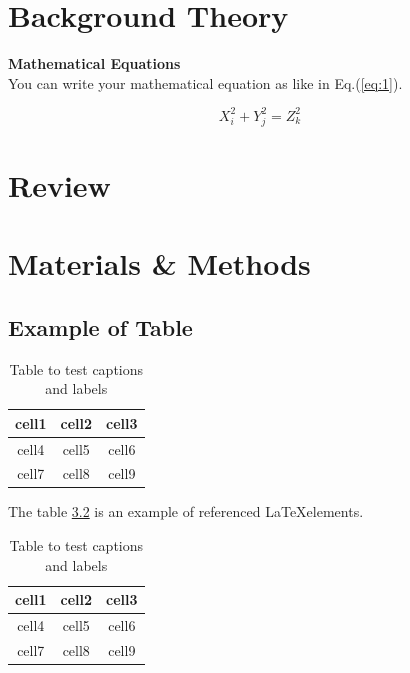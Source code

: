 \documentclass[11pt, a4paper]{report}
\begin{document}
\newpage

\chapter{Background Theory}

{\bf Mathematical Equations}\\

You can write your mathematical equation as like in Eq.(\ref{eq:1}).

\begin{equation}
\label{eq:1}
X_{i}^{2}+Y_{j}^{2}=Z_{k}^{2}
\end{equation}


\newpage

\chapter{Review}

\newpage
\chapter{Materials \& Methods}
\section{Example of Table}



\begin{table}[h]
\centering
\caption{Table to test captions and labels}
\label{table:1}
\begin{tabular}{ |c| c| c| }
\hline
 cell1 & cell2 & cell3 \\ 
 \hline
 cell4 & cell5 & cell6 \\ 
 \hline 
 cell7 & cell8 & cell9   \\ 
 \hline
\end{tabular}

\end{table}




The table \ref{table:2} is an example of referenced \LaTeX elements.
\begin{table}
\centering
\caption{Table to test captions and labels}
\label{table:2}
\begin{tabular}{ |c| c| c| }
\hline
 cell1 & cell2 & cell3 \\ 
 \hline
 cell4 & cell5 & cell6 \\ 
 \hline 
 cell7 & cell8 & cell9   \\ 
 \hline
\end{tabular}

\end{table}
\end{document}
